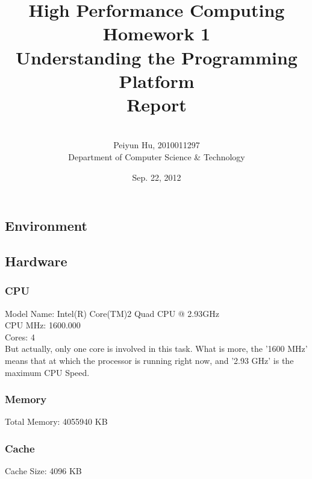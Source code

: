 \documentclass[a4paper]{article}   %
\begin{document}
\begin{CJK}{UTF8}{gbsn}
\begin{spacing}{1.2}

\title{\vspace{120pt}\huge High Performance Computing\\ Homework 1\\[1em] \huge Understanding the Programming Platform\\[1em] \Large Report}
\author{\\[3em]\Large Peiyun Hu, 2010011297 \\ [1em]\Large Department of Computer Science \& Technology}
\date{Sep. 22, 2012}    %
\maketitle

\section{Environment}             %
\subsection{Hardware}

\subsubsection{CPU} \label{info:cpu}

Model Name: Intel(R) Core(TM)2 Quad CPU @ 2.93GHz\\
CPU MHz: 1600.000\\
Cores: 4\\
But actually, only one core is involved in this task. What is more, the '1600 MHz' means that at which the processor is running right now, and '2.93 GHz' is the maximum CPU Speed. 
\subsubsection{Memory} 
Total Memory: 4055940 KB

\subsubsection{Cache} \label{info:cache}
Cache Size: 4096 KB




\end{spacing}
\end{CJK}
\end{document}
